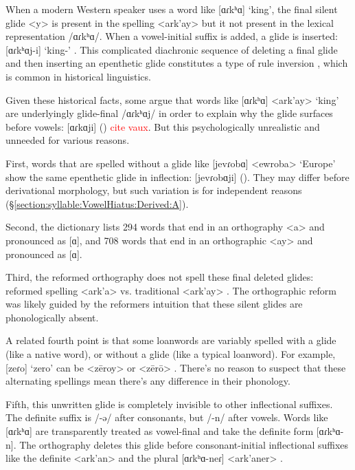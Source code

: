 {	When a modern Western speaker uses a word like [ɑɾkʰɑ] `king',  the final silent glide <y> is  present in the spelling <ark'ay>  but it not present in the lexical representation /ɑɾkʰɑ/. When a vowel-initial suffix is added, a glide is inserted: [ɑɾkʰɑj-i] `king-{\gen}' .    This complicated diachronic sequence of deleting a final glide and then inserting an epenthetic glide constitutes a type of rule inversion \citep{Vennemann-1972-RuleInversion}, which is common in historical linguistics. 
	
	Given these historical facts, some argue that words like [ɑɾkʰɑ] <ark'ay> `king'  are underlyingly glide-final /ɑɾkʰɑj/ in order to explain why the glide surfaces before vowels: [ɑɾkɑji] ({\gendat}) \textcolor{red}{cite vaux}.  But this psychologically unrealistic and unneeded for various reasons.  
	
	First, words that are spelled without a glide like [jevɾobɑ] <ewroba> `Europe' show the same epenthetic glide in inflection: [jevɾobɑji] ({\gendat}). They may differ before derivational morphology, but such variation is for independent reasons (\S\ref{section:syllable:VowelHiatus:Derived:A}). 
	
	Second, the \citeauthor{kouyoumdjian-1970-DictionaryArmenianEnglish} dictionary lists 294 words that end in an orthography <a>  and pronounced as [ɑ], and 708 words that end in an orthographic <ay>  and pronounced as [ɑ]. 
	
	Third, the reformed orthography does not spell these final deleted glides: reformed spelling <ark'a>  vs. traditional <ark'ay> . The orthographic reform was likely guided by the reformers intuition that these silent glides are phonologically absent.  
	
	A related fourth point is that some loanwords are variably spelled with a glide (like  a native word), or without a glide (like a typical loanword).  For example, [zeɾo] `zero' can be <zēroy>  or <zērō> .  There's no reason to suspect that these alternating spellings mean there's any difference in their phonology.   
	
	Fifth, this unwritten glide is completely invisible   to other inflectional suffixes. The definite suffix is /-ə/ after consonants, but /-n/ after vowels. Words like [ɑɾkʰɑ] are transparently treated as vowel-final and take the definite form [ɑɾkʰɑ-n]. The orthography deletes this glide before consonant-initial inflectional suffixes like the definite <ark'an>  and  the plural [ɑɾkʰɑ-neɾ] <ark'aner> . 
	
}
